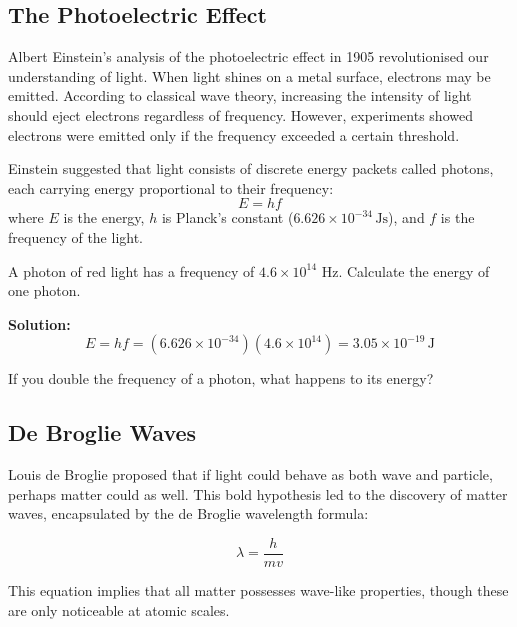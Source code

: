 \subsection{The Photoelectric Effect}
\FloatBarrier

Albert Einstein's analysis of the photoelectric effect in 1905 revolutionised our understanding of light. When light shines on a metal surface, electrons may be emitted. According to classical wave theory, increasing the intensity of light should eject electrons regardless of frequency. However, experiments showed electrons were emitted only if the frequency exceeded a certain threshold.


Einstein suggested that light consists of discrete energy packets called photons, each carrying energy proportional to their frequency:
\[
E = hf
\]
where $E$ is the energy, $h$ is Planck's constant ($6.626\times10^{-34}\,\text{Js}$), and $f$ is the frequency of the light.

\begin{example}
A photon of red light has a frequency of $4.6\times10^{14}$ Hz. Calculate the energy of one photon.

\textbf{Solution:}
\[
E = hf = (6.626\times10^{-34})(4.6\times10^{14}) = 3.05\times10^{-19}\,\text{J}
\]
\end{example}

\begin{stopandthink}
If you double the frequency of a photon, what happens to its energy?
\end{stopandthink}

\subsection{De Broglie Waves}
\FloatBarrier

Louis de Broglie proposed that if light could behave as both wave and particle, perhaps matter could as well. This bold hypothesis led to the discovery of matter waves, encapsulated by the de Broglie wavelength formula:

\[
\lambda = \frac{h}{mv}
\]

This equation implies that all matter possesses wave-like properties, though these are only noticeable at atomic scales.


